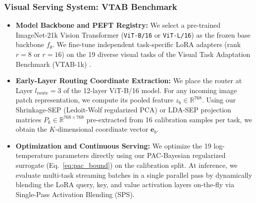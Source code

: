\subsubsection{Visual Serving System: VTAB Benchmark}
\begin{itemize}
    \item \textbf{Model Backbone and PEFT Registry:} We select a pre-trained ImageNet-21k Vision Transformer (\texttt{ViT-B/16} or \texttt{ViT-L/16}) as the frozen base backbone $f_\theta$. We fine-tune independent task-specific LoRA adapters (rank $r=8$ or $r=16$) on the 19 diverse visual tasks of the Visual Task Adaptation Benchmark (VTAB-1k) \cite{zhai2019visual}.
    \item \textbf{Early-Layer Routing Coordinate Extraction:} We place the router at Layer $l_{\text{route}} = 3$ of the 12-layer ViT-B/16 model. For any incoming image patch representation, we compute its pooled feature $z_b \in \mathbb{R}^{768}$. Using our Shrinkage-SEP (Ledoit-Wolf regularized PCA) or LDA-SEP projection matrices $P_k \in \mathbb{R}^{768 \times 768}$ pre-extracted from 16 calibration samples per task, we obtain the $K$-dimensional coordinate vector $\mathbf{e}_b$.
    \item \textbf{Optimization and Continuous Serving:} We optimize the 19 log-temperature parameters directly using our PAC-Bayesian regularized surrogate (Eq.~\ref{eq:pac_bound}) on the calibration split. At inference, we evaluate multi-task streaming batches in a single parallel pass by dynamically blending the LoRA query, key, and value activation layers on-the-fly via Single-Pass Activation Blending (SPS).
\end{itemize}

